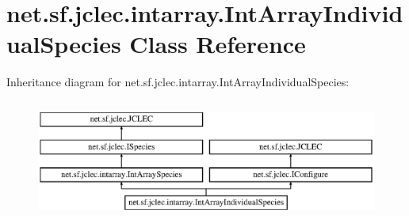 \hypertarget{classnet_1_1sf_1_1jclec_1_1intarray_1_1_int_array_individual_species}{\section{net.\-sf.\-jclec.\-intarray.\-Int\-Array\-Individual\-Species Class Reference}
\label{classnet_1_1sf_1_1jclec_1_1intarray_1_1_int_array_individual_species}
}
Inheritance diagram for net.\-sf.\-jclec.\-intarray.\-Int\-Array\-Individual\-Species\-:\begin{figure}[H]
\begin{center}
\leavevmode
\includegraphics[height=4.000000cm]{classnet_1_1sf_1_1jclec_1_1intarray_1_1_int_array_individual_species}
\end{center}
\end{figure}
